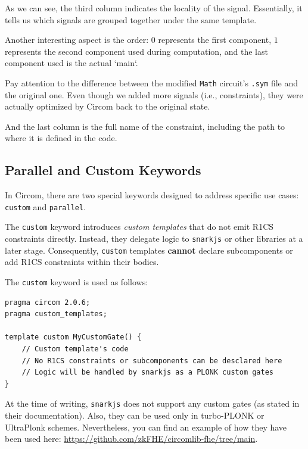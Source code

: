 \documentclass[../../book.tex]{subfiles}
\begin{document}
As we can see, the third column indicates the locality of the signal.
Essentially, it tells us which signals are grouped together under the same template.

Another interesting aspect is the order: $0$ represents the first component, $1$ represents the second component used during computation, and the last component used is the actual `main`.

\begin{remark}
    Pay attention to the difference between the modified \texttt{Math} circuit's \texttt{.sym} file and the original one.
    Even though we added more signals (i.e., constraints), they were actually optimized by Circom back to the original state.
\end{remark}

And the last column is the full name of the constraint, including the path to where it is defined in the code.

\subsection{Parallel and Custom Keywords}

In Circom, there are two special keywords designed to address specific use cases: \texttt{custom} and \texttt{parallel}.

The \texttt{custom} keyword introduces \emph{custom templates} that do not emit R1CS constraints directly.
Instead, they delegate logic to \texttt{snarkjs} or other libraries at a later stage.
Consequently, \texttt{custom} templates \textbf{cannot} declare subcomponents or add R1CS constraints within their bodies.

The \texttt{custom} keyword is used as follows:

\begin{lstlisting}[language=Circom,basicstyle=\ttfamily\footnotesize]
pragma circom 2.0.6;
pragma custom_templates;

template custom MyCustomGate() {
    // Custom template's code
    // No R1CS constraints or subcomponents can be desclared here
    // Logic will be handled by snarkjs as a PLONK custom gates
}
\end{lstlisting}

\begin{remark}
    At the time of writing, \texttt{snarkjs} does not support any custom gates (as stated in their documentation).
    Also, they can be used only in turbo-PLONK or UltraPlonk schemes.
    Nevertheless, you can find an example of how they have been used here: \url{https://github.com/zkFHE/circomlib-fhe/tree/main}.
\end{remark}
\end{document}
